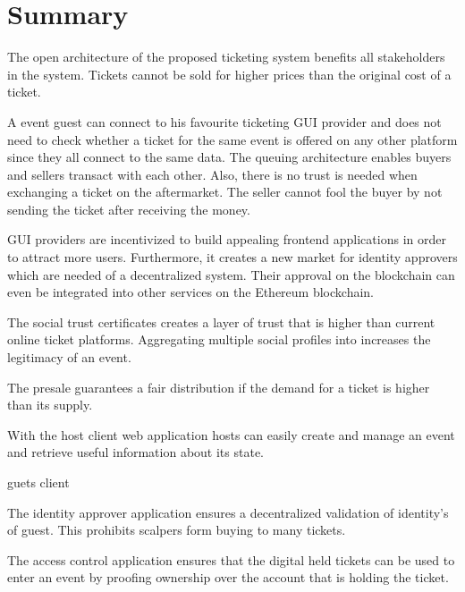 \chapter{Summary}\label{chapter:summary}

The open architecture of the proposed ticketing system benefits all stakeholders in the system. Tickets cannot be sold for higher prices than the original cost of a ticket. 

A event guest can connect to his favourite ticketing GUI provider and does not need to check whether a ticket for the same event is offered on any other platform since they all connect to the same data. The queuing architecture enables buyers and sellers transact with each other. Also, there is no trust is needed when exchanging a ticket on the aftermarket. The seller cannot fool the buyer by not sending the ticket after receiving the money. 

GUI providers are incentivized to build appealing frontend applications in order to attract more users. Furthermore, it creates a new market for identity approvers which are needed of a decentralized system. Their approval on the blockchain can even be integrated into other services on the Ethereum blockchain. 

The social trust certificates creates a layer of trust that is higher than current online ticket platforms. Aggregating multiple social profiles into increases the legitimacy of an event.  

The presale guarantees a fair distribution if the demand for a ticket is higher than its supply. 

With the host client web application hosts can easily create and manage an event and retrieve useful information about its state.

guets client

The identity approver application ensures a decentralized validation of identity's of guest. This prohibits scalpers form buying to many tickets.

The access control application ensures that the digital held tickets can be used to enter an event by proofing ownership over the account that is holding the ticket.

